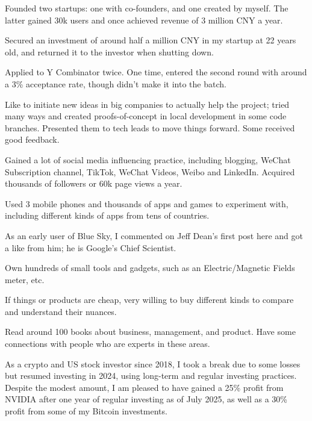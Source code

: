 
\begin{cventries}

  \cventry
    {} %
    {} %
    {} %
    {} %
    {
      \begin{cvitems}
        \item {Founded two startups: one with co-founders, and one created by myself. The latter gained 30k users and once achieved revenue of 3 million CNY a year.}
        \item {Secured an investment of around half a million CNY in my startup at 22 years old, and returned it to the investor when shutting down.}
        \item {Applied to Y Combinator twice. One time, entered the second round with around a 3\% acceptance rate, though didn't make it into the batch.}
        \item {Like to initiate new ideas in big companies to actually help the project; tried many ways and created proofs-of-concept in local development in some code branches. Presented them to tech leads to move things forward. Some received good feedback.}
        \item {Gained a lot of social media influencing practice, including blogging, WeChat Subscription channel, TikTok, WeChat Videos, Weibo and LinkedIn. Acquired thousands of followers or 60k page views a year.}
        \item {Used 3 mobile phones and thousands of apps and games to experiment with, including different kinds of apps from tens of countries.}
        \item {As an early user of Blue Sky, I commented on Jeff Dean's first post here and got a like from him; he is Google's Chief Scientist.}
        \item {Own hundreds of small tools and gadgets, such as an Electric/Magnetic Fields meter, etc.}
        \item {If things or products are cheap, very willing to buy different kinds to compare and understand their nuances.}
        \item {Read around 100 books about business, management, and product. Have some connections with people who are experts in these areas.}
        \item {As a crypto and US stock investor since 2018, I took a break due to some losses but resumed investing in 2024, using long-term and regular investing practices. Despite the modest amount, I am pleased to have gained a 25\% profit from NVIDIA after one year of regular investing as of July 2025, as well as a 30\% profit from some of my Bitcoin investments.}
      \end{cvitems}
    }

\end{cventries}

